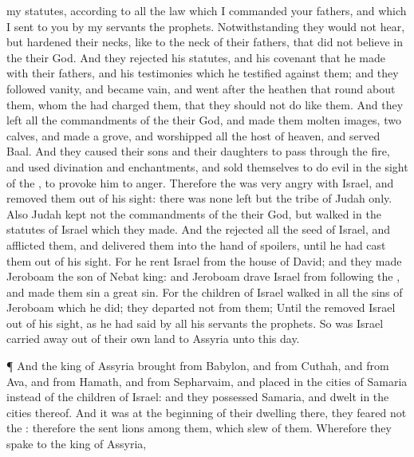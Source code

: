 {{} my
statutes, according to all the
law which I
commanded your
fathers, and which I
sent to you
by my
servants the
prophets.
Notwithstanding they would not
hear, but
hardened their
necks, like to the
neck of their
fathers, that did not
believe in the
{} their
God.
And they
rejected his
statutes, and his
covenant that he
made with their
fathers, and his
testimonies which he
testified against them; and they
followed
vanity, and became
vain, and went
after the
heathen that
{} round
about them,
{} whom the
{} had
charged them, that they should not
do like them.
And they
left all the
commandments of the
{} their
God, and
made them molten
images,
{}
two
calves, and
made a
grove, and
worshipped all the
host of
heaven, and
served
Baal.
And they caused their
sons and their
daughters to
pass through the
fire, and
used
divination and
enchantments, and
sold themselves to
do
evil in the
sight of the
{}, to provoke him to
anger.
Therefore the
{} was
very
angry with
Israel, and
removed them out of his
sight: there was none
left but the
tribe of
Judah only.
Also
Judah
kept not the
commandments of the
{} their
God, but
walked in the
statutes of
Israel which they
made.
And the
{}
rejected all the
seed of
Israel, and
afflicted them, and
delivered them into the
hand of
spoilers, until he had
cast them out of his
sight.
For he
rent
Israel from the
house of
David; and they made
Jeroboam the
son of
Nebat
king: and
Jeroboam
drave
Israel from
following the
{}, and made them
sin a
great
sin.
For the
children of
Israel
walked in all the
sins of
Jeroboam which he
did; they
departed not from them;
Until the
{}
removed
Israel out of his
sight, as he had
said
by all his
servants the
prophets. So was
Israel carried
away out of their own
land to
Assyria unto this
day.
\par }{\PP {}¶ And the
king of
Assyria
brought
{} from
Babylon, and from
Cuthah, and from
Ava, and from
Hamath, and from
Sepharvaim, and
placed
{} in the
cities of
Samaria instead of the
children of
Israel: and they
possessed
Samaria, and
dwelt in the
cities thereof.
And
{} it was at the
beginning of their
dwelling there,
{} they
feared not the
{}: therefore the
{}
sent
lions among them, which
slew
{} of them.
Wherefore they
spake to the
king of
Assyria,
}
